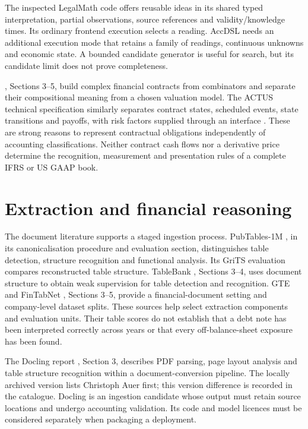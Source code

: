 The inspected LegalMath code offers reusable ideas in its shared typed
interpretation, partial observations, source references and validity/knowledge
times. Its ordinary frontend execution selects a reading. AccDSL needs an
additional execution mode that retains a family of readings, continuous
unknowns and economic state. A bounded candidate generator is useful for
search, but its candidate limit does not prove completeness.

\citet{jones2000}, Sections 3--5, build complex financial contracts from
combinators and separate their compositional meaning from a chosen valuation
model. The ACTUS technical specification similarly separates contract states,
scheduled events, state transitions and payoffs, with risk factors supplied
through an interface \citep{actus}. These are strong reasons to represent
contractual obligations independently of accounting classifications. Neither
contract cash flows nor a derivative price determine the recognition,
measurement and presentation rules of a complete IFRS or US GAAP book.

\section{Extraction and financial reasoning}

The document literature supports a staged ingestion process. PubTables-1M
\citep{smock2022}, in its canonicalisation procedure and evaluation section,
distinguishes table detection, structure recognition and functional analysis.
Its GriTS evaluation compares reconstructed table structure. TableBank
\citep{li2020}, Sections 3--4, uses document structure to obtain weak supervision
for table detection and recognition. GTE and FinTabNet \citep{zheng2021},
Sections 3--5, provide a financial-document setting and company-level dataset
splits. These sources help select extraction components and evaluation units.
Their table scores do not establish that a debt note has been interpreted
correctly across years or that every off-balance-sheet exposure has been found.

The Docling report \citep{nassar2024}, Section 3, describes PDF parsing, page
layout analysis and table structure recognition within a document-conversion
pipeline. The locally archived version lists Christoph Auer first; this
version difference is recorded in the catalogue. Docling is an ingestion
candidate whose output must retain source locations and undergo accounting
validation. Its code and model licences must be considered separately when
packaging a deployment.

